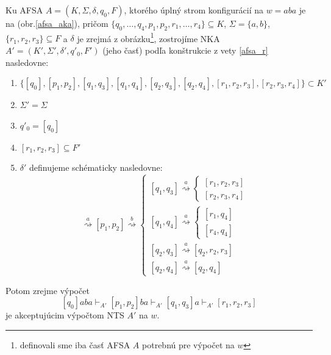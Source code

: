 \begin{priklad}
Ku AFSA $A=(K,\Sigma,\delta,q_0,F)$, ktorého úplný strom
konfigurácií na $w=aba$ je na (obr.\ref{afsa_aka}), pričom
$\{q_0,\dots,q_4,p_1,p_2,r_1,\dots,r_4\}\subseteq K$,
$\Sigma=\{a,b\}$, $\{r_1,r_2,r_3\}\subseteq F$ a $\delta$ je
zrejmá z obrázku\footnote{definovali sme iba časť AFSA $A$
potrebnú pre výpočet na $w$}, zostrojíme NKA
$A'=(K',\Sigma',\delta',q'_0,F')$ (jeho časť) podľa konštrukcie z
vety \ref{afsa_r} nasledovne:
\begin{enumerate}
\item
$\{[q_0],[p_1,p_2],[q_1,q_3],[q_1,q_4],
[q_2,q_3],[q_2,q_4],[r_1,r_2,r_3],[r_2,r_3,r_4]\}\subset K'$
\item $\Sigma'=\Sigma$
\item $q'_0=[q_0]$
\item $[r_1,r_2,r_3]\subseteq F'$
\item $\delta'$ definujeme schématicky nasledovne:
\begin{displaymath}
[q_0]\overset{a}{\rightsquigarrow}[p_1,p_2]\overset{b}{\rightsquigarrow}
\left\{
\begin{array}{l}
{[q_1,q_3]}\overset{a}{\rightsquigarrow}
\left\{
\begin{array}{l}
{[r_1,r_2,r_3]}\\
{[r_2,r_3,r_4]}
\end{array}
\right.
\\
{[q_1,q_4]}\overset{a}{\rightsquigarrow}
\left\{
\begin{array}{l}
{[r_1,q_4]}\\
{[r_4,q_4]}
\end{array}
\right.
\\
{[q_2,q_3]}\overset{a}{\rightsquigarrow}
{[q_2,r_2,r_3]}
\\
{[q_2,q_4]}\overset{a}{\rightsquigarrow}{[q_2,q_4]}
\end{array}
\right.
\end{displaymath}
\end{enumerate}
Potom zrejme výpočet
\[
[q_0]aba\vdash_{A'}[p_1,p_2]ba\vdash_{A'}[q_1,q_3]a
\vdash_{A'}[r_1,r_2,r_3]
\]
je akceptujúcim výpočtom NTS $A'$ na $w$.
\end{priklad}

